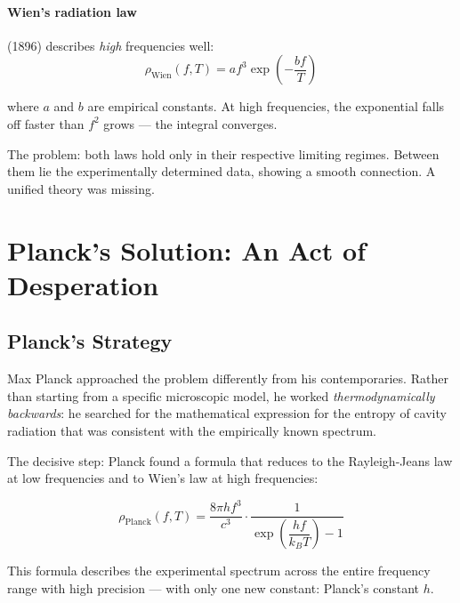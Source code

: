 \paragraph{Wien's radiation law} (1896) describes \emph{high} frequencies well:
\begin{equation}
    \rho_{\text{Wien}}(f, T) = af^3 \exp\!\left(-\frac{bf}{T}\right)
    \label{eq:wien_law}
\end{equation}

where $a$ and $b$ are empirical constants. At high frequencies, the exponential 
falls off faster than $f^2$ grows — the integral converges.

The problem: both laws hold only in their respective limiting regimes. Between them 
lie the experimentally determined data, showing a smooth connection. A unified theory 
was missing.

\clearpage

\section{Planck's Solution: An Act of Desperation}
\label{sec:planck}

\subsection{Planck's Strategy}

Max Planck approached the problem differently from his contemporaries. Rather than 
starting from a specific microscopic model, he worked \emph{thermodynamically 
backwards}: he searched for the mathematical expression for the entropy of cavity 
radiation that was consistent with the empirically known spectrum.

The decisive step: Planck found a formula that reduces to the Rayleigh-Jeans law at 
low frequencies and to Wien's law at high frequencies:

\begin{equation}
    \rho_{\text{Planck}}(f, T) = \frac{8\pi h f^3}{c^3} \cdot \frac{1}{\exp\!\left(\dfrac{hf}{k_BT}\right) - 1}
    \label{eq:planck_law}
\end{equation}

This formula describes the experimental spectrum across the entire frequency range 
with high precision — with only one new constant: Planck's constant $h$.

